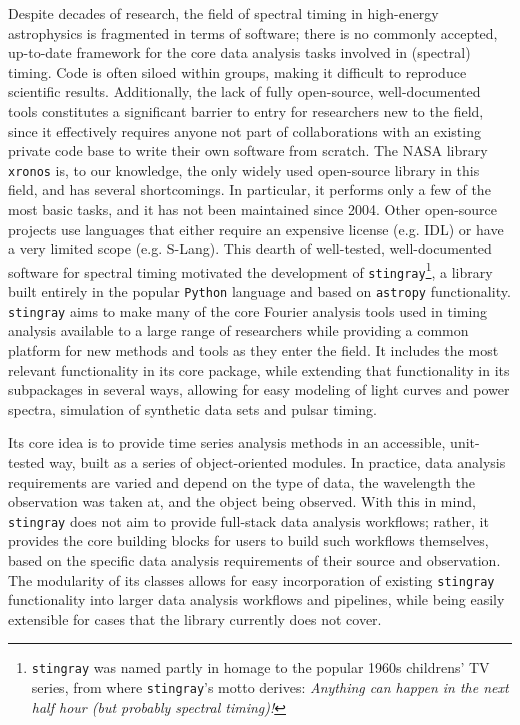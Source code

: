 \documentclass[twocolumn]{aastex62}
\newcommand{\python}{\texttt{Python}\xspace}
\newcommand{\stingray}{\texttt{stingray}\xspace}
\newcommand{\astropy}{\texttt{astropy}\xspace}
\begin{document}
Despite decades of research, the field of spectral timing in high-energy astrophysics is fragmented in terms of software; there is no commonly accepted, up-to-date framework for the core data analysis tasks involved in (spectral) timing. Code is often siloed within groups, making it difficult to reproduce scientific results. 
Additionally, the lack of fully open-source, well-documented tools constitutes a significant barrier to entry for researchers new to the field, since it effectively requires anyone not part of collaborations with an existing private code base to write their own software from scratch.
The NASA library \texttt{xronos} is, to our knowledge, the only widely used open-source library in this field, and has several shortcomings. 
In particular, it performs only a few of the most basic tasks, and it has not been maintained since 2004. 
Other open-source projects use languages that either require an expensive license (e.g. IDL) or have a very limited scope (e.g. S-Lang).
This dearth of well-tested, well-documented software for spectral timing motivated the development of \stingray\footnote{\stingray was named partly in homage to the popular 1960s childrens' TV series, from where \stingray's motto derives: \textit{Anything can happen in the next half hour (but probably spectral timing)!}}, a library built entirely in the popular \python language and based on \astropy functionality. 
\stingray aims to make many of the core Fourier analysis tools used in timing analysis available to a large range of researchers while providing a common platform for new methods and tools as they enter the field. 
It includes the most relevant functionality in its core package, while extending that functionality in its subpackages in several ways, allowing for easy modeling of light curves and power spectra, simulation of synthetic data sets and pulsar timing. 

Its core idea is to provide time series analysis methods in an accessible, unit-tested way, built as a series of object-oriented modules. In practice, data analysis requirements are varied and depend on the type of data, the wavelength the observation was taken at, and the object being observed. With this in mind, \stingray does not aim to provide full-stack data analysis workflows; rather, it provides the core building blocks for users to build such workflows themselves, based on the specific data analysis requirements of their source and observation. 
The modularity of its classes allows for easy incorporation of existing \stingray functionality into larger data analysis workflows and pipelines, while being easily extensible for cases that the library currently does not cover. 
\end{document}
